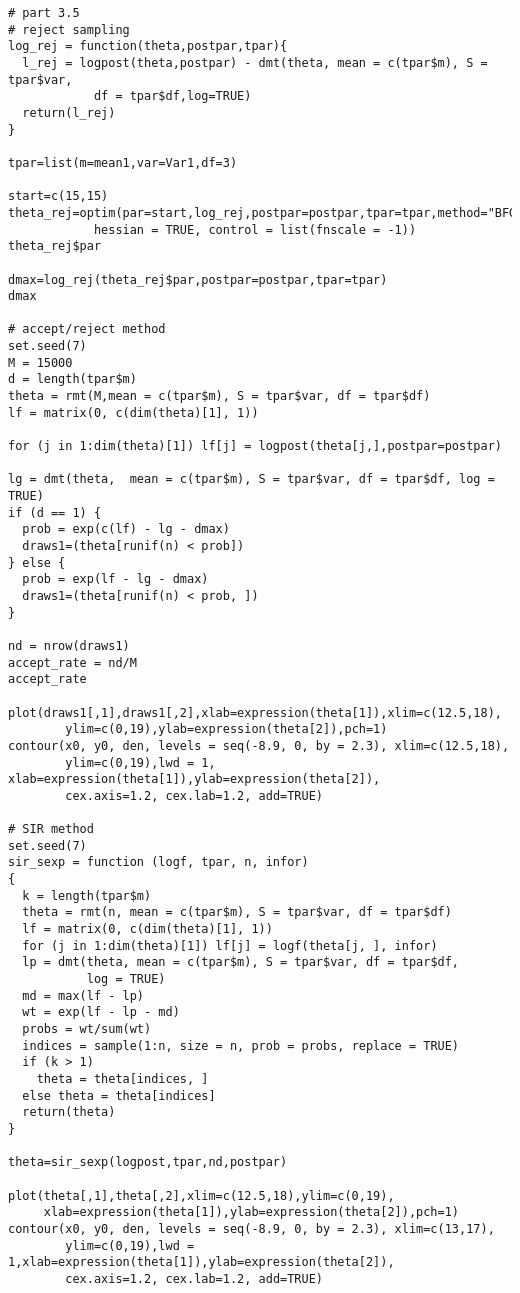 \documentclass[a4paper, 11pt]{article}
\begin{document}
\begin{verbatim}
# part 3.5
# reject sampling
log_rej = function(theta,postpar,tpar){
  l_rej = logpost(theta,postpar) - dmt(theta, mean = c(tpar$m), S = tpar$var, 
  			df = tpar$df,log=TRUE) 
  return(l_rej)
}

tpar=list(m=mean1,var=Var1,df=3)

start=c(15,15)
theta_rej=optim(par=start,log_rej,postpar=postpar,tpar=tpar,method="BFGS",
		  	hessian = TRUE, control = list(fnscale = -1))
theta_rej$par

dmax=log_rej(theta_rej$par,postpar=postpar,tpar=tpar)
dmax

# accept/reject method
set.seed(7)
M = 15000
d = length(tpar$m)
theta = rmt(M,mean = c(tpar$m), S = tpar$var, df = tpar$df)
lf = matrix(0, c(dim(theta)[1], 1))

for (j in 1:dim(theta)[1]) lf[j] = logpost(theta[j,],postpar=postpar)

lg = dmt(theta,  mean = c(tpar$m), S = tpar$var, df = tpar$df, log = TRUE)
if (d == 1) {
  prob = exp(c(lf) - lg - dmax)
  draws1=(theta[runif(n) < prob])
} else {
  prob = exp(lf - lg - dmax)
  draws1=(theta[runif(n) < prob, ])
}

nd = nrow(draws1)
accept_rate = nd/M
accept_rate  

plot(draws1[,1],draws1[,2],xlab=expression(theta[1]),xlim=c(12.5,18),
		ylim=c(0,19),ylab=expression(theta[2]),pch=1)
contour(x0, y0, den, levels = seq(-8.9, 0, by = 2.3), xlim=c(12.5,18),
		ylim=c(0,19),lwd = 1, xlab=expression(theta[1]),ylab=expression(theta[2]),
        cex.axis=1.2, cex.lab=1.2, add=TRUE)

# SIR method
set.seed(7)
sir_sexp = function (logf, tpar, n, infor) 
{
  k = length(tpar$m)
  theta = rmt(n, mean = c(tpar$m), S = tpar$var, df = tpar$df)
  lf = matrix(0, c(dim(theta)[1], 1))
  for (j in 1:dim(theta)[1]) lf[j] = logf(theta[j, ], infor)
  lp = dmt(theta, mean = c(tpar$m), S = tpar$var, df = tpar$df, 
           log = TRUE)
  md = max(lf - lp)
  wt = exp(lf - lp - md)
  probs = wt/sum(wt)
  indices = sample(1:n, size = n, prob = probs, replace = TRUE)
  if (k > 1) 
    theta = theta[indices, ]
  else theta = theta[indices]
  return(theta)
}

theta=sir_sexp(logpost,tpar,nd,postpar)

plot(theta[,1],theta[,2],xlim=c(12.5,18),ylim=c(0,19),
     xlab=expression(theta[1]),ylab=expression(theta[2]),pch=1)
contour(x0, y0, den, levels = seq(-8.9, 0, by = 2.3), xlim=c(13,17),
		ylim=c(0,19),lwd = 1,xlab=expression(theta[1]),ylab=expression(theta[2]),
        cex.axis=1.2, cex.lab=1.2, add=TRUE)
        


\end{verbatim}
\end{document}
